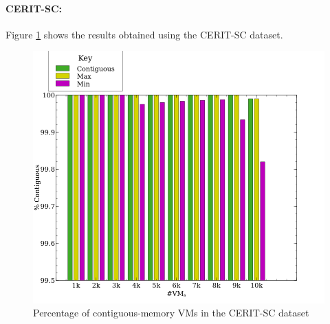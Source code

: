 \documentclass[sigconf]{sigplanconf}
\begin{document}
  \paragraph{CERIT-SC:} 
  Figure \ref{fig:cerit_res} shows the results obtained using the CERIT-SC dataset.
  \begin{figure}[!h]
  	\centering
  	\includegraphics[scale=0.35]{cerit-final.png}
  	\caption{Percentage of contiguous-memory VMs in the CERIT-SC dataset}
  	\label{fig:cerit_res}
  \end{figure}
  
\end{document}
